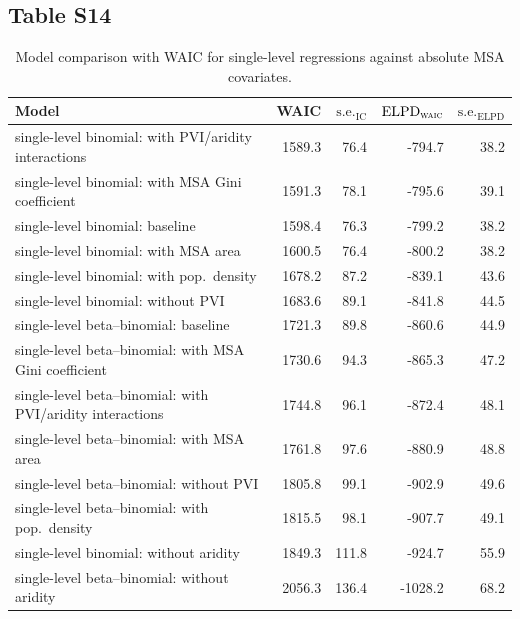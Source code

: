 \documentclass[draft]{agujournal}\usepackage{knitr}
\begin{document}
\subsection*{Table S14}
\begin{table}[H]
\centering
\begingroup\small
\begin{tabular}{p{3in}rrrr}
  \hline
Model & WAIC & $\text{s.e.}_{\text{IC}}$ & $\text{ELPD}_{\text{\scshape{waic}}}$ & $\text{s.e.}_{\text{ELPD}}$ \\ 
  \hline
single-level binomial: with PVI/aridity interactions & 1589.3 & 76.4 & -794.7 & 38.2 \\ 
  single-level binomial: with MSA Gini coefficient & 1591.3 & 78.1 & -795.6 & 39.1 \\ 
  single-level binomial: baseline & 1598.4 & 76.3 & -799.2 & 38.2 \\ 
  single-level binomial: with MSA area & 1600.5 & 76.4 & -800.2 & 38.2 \\ 
  single-level binomial: with pop.\ density & 1678.2 & 87.2 & -839.1 & 43.6 \\ 
  single-level binomial: without PVI & 1683.6 & 89.1 & -841.8 & 44.5 \\ 
  single-level beta--binomial: baseline & 1721.3 & 89.8 & -860.6 & 44.9 \\ 
  single-level beta--binomial: with MSA Gini coefficient & 1730.6 & 94.3 & -865.3 & 47.2 \\ 
  single-level beta--binomial: with PVI/aridity interactions & 1744.8 & 96.1 & -872.4 & 48.1 \\ 
  single-level beta--binomial: with MSA area & 1761.8 & 97.6 & -880.9 & 48.8 \\ 
  single-level beta--binomial: without PVI & 1805.8 & 99.1 & -902.9 & 49.6 \\ 
  single-level beta--binomial: with pop.\ density & 1815.5 & 98.1 & -907.7 & 49.1 \\ 
  single-level binomial: without aridity & 1849.3 & 111.8 & -924.7 & 55.9 \\ 
  single-level beta--binomial: without aridity & 2056.3 & 136.4 & -1028.2 & 68.2 \\ 
   \hline
\end{tabular}
\endgroup
\caption[Model comparison: WAIC (alternate-covariates using alternative scaling) for single-level regressions.]{Model comparison with WAIC for single-level regressions against absolute MSA covariates.} 
\label{tab:waic.vars}
\end{table}
\end{document}
